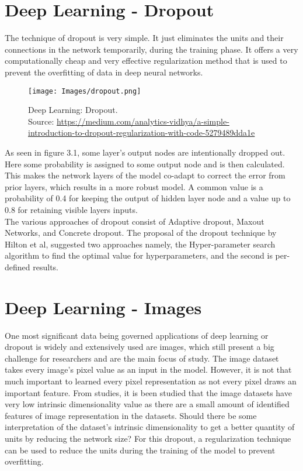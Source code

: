 \documentclass[12pt,letterpaper]{report}
\begin{document}
\section{Deep Learning - Dropout}
The technique of dropout is very simple. It just eliminates the units and their connections in the network temporarily, during the training phase. It offers a very computationally cheap and very effective regularization method that is used to prevent the overfitting of data in deep neural networks. 

\begin{figure}[h]
    \centering
    \texttt{[image: Images/dropout.png]}
    \caption{Deep Learning: Dropout. \\Source: \href{https://medium.com/analytics-vidhya/a-simple-introduction-to-dropout-regularization-with-code-5279489dda1e}{https://medium.com/analytics-vidhya/a-simple-introduction-to-dropout-regularization-with-code-5279489dda1e}}
    \label{fig:Deep Larning: Dropout}
\end{figure}

As seen in figure 3.1, some layer's output nodes are intentionally dropped out. Here some probability is assigned to some output node and is then calculated. This makes the network layers of the model co-adapt to correct the error from prior layers, which results in a more robust model. A common value is a probability of 0.4 for keeping the output of hidden layer node and a value up to 0.8 for retaining visible layers inputs\cite{11}. \\

The various approaches of dropout consist of Adaptive dropout, Maxout Networks, and Concrete dropout. The proposal of the dropout technique by Hilton et al, suggested two approaches namely, the Hyper-parameter search algorithm to find the optimal value for hyperparameters, and the second is per-defined results.

\section{Deep Learning - Images}
One most significant data being governed applications of deep learning or dropout is widely and extensively used are images, which still present a big challenge for researchers and are the main focus of study. The image dataset takes every image's pixel value as an input in the model. However, it is not that much important to learned every pixel representation as not every pixel draws an important feature. From studies, it is been studied that the image datasets have very low intrinsic dimensionality value as there are a small amount of identified features of image representation in the datasets. Should there be some interpretation of the dataset's intrinsic dimensionality to get a better quantity of units by reducing the network size? For this dropout, a regularization technique can be used to reduce the units during the training of the model to prevent overfitting. \\
\end{document}
